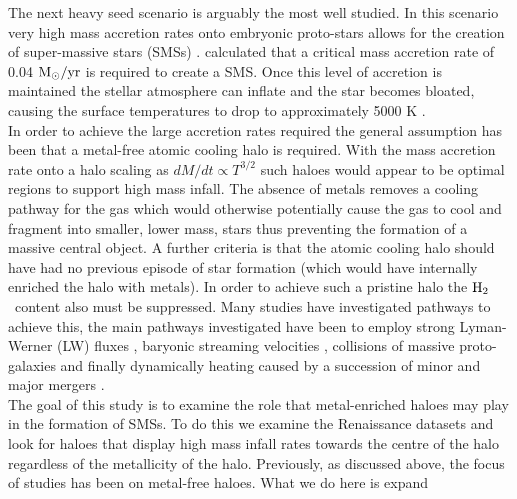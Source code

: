 \documentclass[graphics, twocolumn, usenatbib]{mn2e}
\newcommand{\msolaryr} {$\rm{M_{\odot}/yr}~$}
\newcommand{\molH} {$\rm{H_2}$~}
\begin{document}
\indent The next heavy seed scenario is arguably the most well studied. In this scenario very high
mass accretion rates onto embryonic proto-stars allows for the creation of super-massive stars (SMSs)
\citep{Shapiro_1979, Begelman_2008, Schleicher_2013, Hosokawa_2013, Inayoshi_2014, Sakurai_2016,
  Umeda_2016, Haemmerle_2017,Woods_2017, Woods_2018, Regan_2018b}. \cite{Sakurai_2016} calculated
that a critical mass accretion rate of 0.04 \msolaryr is required to create a SMS.
Once this level of accretion is maintained the stellar atmosphere can inflate and the star becomes
bloated, causing the surface temperatures to drop to approximately 5000 K \citep{Hosokawa_2013, 
Woods_2017}. \\
\indent In order to achieve the large accretion rates required the general assumption has been
that a metal-free atomic cooling halo is required.
With the mass accretion rate onto a halo scaling as $dM/dt \propto T^{3/2}$ such haloes would appear
to be optimal regions to support high mass infall. The absence of metals removes a cooling pathway for
the gas which would otherwise potentially cause the gas to cool and fragment into smaller, lower
mass, stars thus preventing the formation of a massive central object. A further criteria is that the
atomic cooling halo should have had no previous episode of star formation (which would have
internally enriched the halo with metals). In order to achieve such a pristine halo the \molH content
also must be suppressed. Many studies have investigated pathways to achieve this, the main pathways
investigated have been to employ strong Lyman-Werner (LW) fluxes \citep{Dijkstra_2008, Shang_2010,
  Regan_2014b, Latif_2014b, Agarwal_2015a, Latif_2015, Regan_2016a, Regan_2017, Regan_2018a},
baryonic streaming velocities
\citep{Tseliakhovich_2010, Tanaka_2014, Hirano_2017, Schauer_2017}, collisions of massive
proto-galaxies \citep{Mayer_2010, Mayer_2014, Inayoshi_2015} and finally dynamically heating caused
by a succession of minor and major mergers \citep{Yoshida_2003a, Fernandez_2014, Wise_2019}. \\
\indent The goal of this study is to examine the role that metal-enriched haloes may play in the
  formation of SMSs. 
  To do this we examine the Renaissance datasets and look for haloes that display high mass infall
  rates towards the centre of the halo regardless of the metallicity of the halo. Previously, as
  discussed above, the focus of studies has been on metal-free haloes. What we do here is expand
\end{document}
